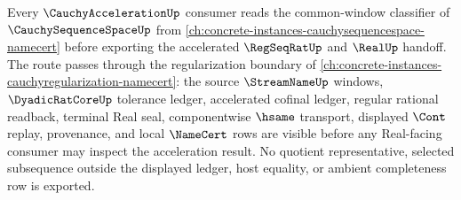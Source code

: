 \begin{theorem}
\label{thm:cauchy-acceleration-sequence-space-route}
Every $\CauchyAccelerationUp$ consumer reads the common-window classifier of $\CauchySequenceSpaceUp$ from \autoref{ch:concrete-instances-cauchysequencespace-namecert} before exporting the accelerated $\RegSeqRatUp$ and $\RealUp$ handoff. The route passes through the regularization boundary of \autoref{ch:concrete-instances-cauchyregularization-namecert}: the source $\StreamNameUp$ windows, $\DyadicRatCoreUp$ tolerance ledger, accelerated cofinal ledger, regular rational readback, terminal Real seal, componentwise $\hsame$ transport, displayed $\Cont$ replay, provenance, and local $\NameCert$ rows are visible before any Real-facing consumer may inspect the acceleration result. No quotient representative, selected subsequence outside the displayed ledger, host equality, or ambient completeness row is exported.
\end{theorem}
